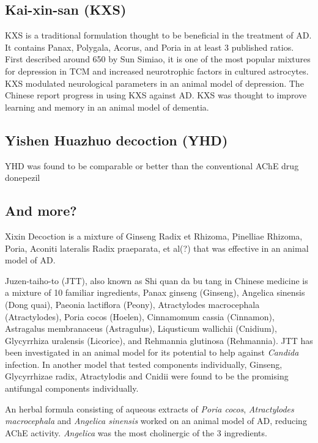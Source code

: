 \subsection{Kai-xin-san (KXS)}
KXS is a traditional formulation thought to be beneficial in the treatment
of AD.
It contains
Panax,
Polygala,
Acorus,
and Poria in at least 3 published ratios.
First described around 650 by Sun Simiao,
it is one of the most popular mixtures for depression in TCM
and increased neurotrophic factors in cultured astrocytes.
\cite{zhu2013kai}
KXS modulated neurological parameters in an animal model of depression.
\cite{zhu2012standardized}
The Chinese report progress in using KXS against AD.
\cite{wen2013research}
KXS was thought to improve learning and memory in an animal model of dementia.
\cite{li2009effects}






\subsection{Yishen Huazhuo decoction (YHD)}
YHD was found to be comparable or better than
the conventional AChE drug donepezil

\cite{zhang2015cognitive}


\subsection{And more?}


Xixin Decoction is a mixture of
Ginseng Radix et Rhizoma,
Pinelliae Rhizoma,
Poria,
Aconiti lateralis Radix praeparata,
et al(?)
that was effective in an animal model of AD.
\cite{diwu2013effect}



Juzen-taiho-to (JTT), also known as
Shi quan da bu tang in Chinese medicine
is a mixture of 10 familiar ingredients,
Panax ginseng (Ginseng),
Angelica sinensis (Dong quai),
Paeonia lactiflora (Peony),
Atractylodes macrocephala (Atractylodes),
Poria cocos (Hoelen),
Cinnamomum cassia (Cinnamon),
Astragalus membranaceus (Astragulus),
Liqusticum wallichii (Cnidium),
Glycyrrhiza uralensis (Licorice),
and Rehmannia glutinosa (Rehmannia).
JTT has been investigated in an animal model
for its potential to help against \textit{Candida}
infection.
\cite{akagawa1996protection}
In another model that tested components individually,
Ginseng, Glycyrrhizae radix, Atractylodis and Cnidii
were found to be the promising antifungal components individually.
\cite{abe1998protective}



An herbal formula consisting
of aqueous extracts of
\textit{Poria cocos}, \textit{Atractylodes macrocephala}
and \textit{Angelica sinensis} worked on
an animal model of AD, reducing AChE activity.
\textit{Angelica} was the most cholinergic of the 3 ingredients.
\cite{lin2009aqueous}


